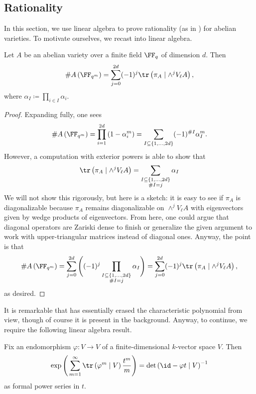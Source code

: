 \documentclass{amsart}
\begin{document}
\subsection{Rationality}
In this section, we use linear algebra to prove rationality (as in ) for abelian varieties. To motivate ourselves, we recast  into linear algebra.
\begin{lemma} \label{lem:count-points-by-trace}
	Let $A$ be an abelian variety over a finite field $\FF_q$ of dimension $d$. Then
	\[\#A\left(\FF_{q^m}\right)=\sum_{j=0}^{2d}(-1)^j\tr\left(\pi_A\mid\wedge^jV_\ell A\right),\]
	where $\alpha_I\coloneqq\prod_{i\in I}\alpha_i$.
\end{lemma}
\begin{proof}
	Expanding  fully, one sees
	\[\#A\left(\FF_{q^m}\right)=\prod_{i=1}^{2d}\left(1-\alpha_i^m\right)=\sum_{\substack{I\subseteq\{1,\ldots,2d\}}}(-1)^{\#I}\alpha_I^m.\]
	However, a computation with exterior powers is able to show that
	\[\tr\left(\pi_A\mid\land^jV_\ell A\right)=\sum_{\substack{I\subseteq\{1,\ldots,2d\}\\\#I=j}}\alpha_I\]
	We will not show this rigorously, but here is a sketch: it is easy to see if $\pi_A$ is diagonalizable because $\pi_A$ remains diagonalizable on $\land^jV_\ell A$ with eigenvectors given by wedge products of eigenvectors. From here, one could argue that diagonal operators are Zariski dense to finish or generalize the given argument to work with upper-triangular matrices instead of diagonal ones. Anyway, the point is that
	\[\#A\left(\FF_{q^m}\right)=\sum_{j=0}^{2d}\Bigg((-1)^j\prod_{\substack{I\subseteq\{1,\ldots,2d\}\\\#I=j}}\alpha_I\Bigg)=\sum_{j=0}^{2d}(-1)^j\tr\left(\pi_A\mid\land^jV_\ell A\right),\]
	as desired.
\end{proof}
It is remarkable that  has essentially erased the characteristic polynomial from view, though of course it is present in the background. Anyway, to continue, we require the following linear algebra result.
\begin{lemma} \label{lem:remove-exp-zeta}
	Fix an endomorphism $\varphi\colon V\to V$ of a finite-dimensional $k$-vector space $V$. Then
	\[\exp\Bigg(\sum_{m=1}^\infty\tr\left(\varphi^m\mid V\right)\frac{t^m}m\Bigg)=\det\left({\id}-\varphi t\mid V\right)^{-1}\]
	as formal power series in $t$.
\end{lemma}
\end{document}
